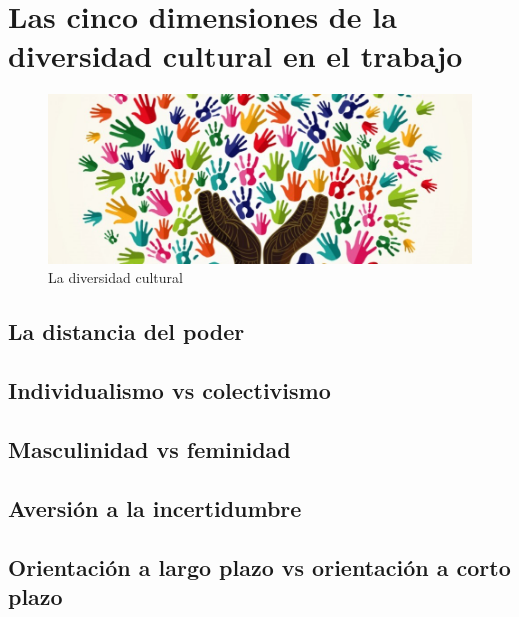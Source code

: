 \documentclass{rbfin}
\begin{document}


\section{Las cinco dimensiones de la diversidad cultural en el trabajo}
\label{sec-intro}
\lipsum[1-9]

\begin{figure}
    \centering
    \includegraphics[scale=0.4]{media/Imagen.jpg}
    \caption{La diversidad cultural}
    \label{fig:my_label}
\end{figure}




\subsection{La distancia del poder}

\lipsum[1-8]

\subsection{Individualismo vs colectivismo}

\lipsum[1-11]

\subsection{Masculinidad vs feminidad}

\lipsum[1-5]

\subsection{Aversión a la incertidumbre}

\lipsum[1-15]
\subsection{Orientación a largo plazo vs orientación a corto plazo}

\lipsum[1-9]
\end{document}
